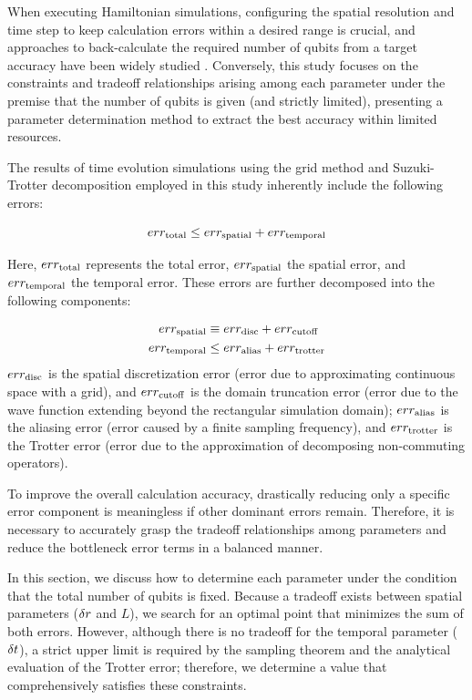 \documentclass[aip-draft.tex]{subfiles}
\begin{document}
When executing Hamiltonian simulations, configuring the spatial resolution and
time step to keep calculation errors within a desired range is crucial, and
approaches to back-calculate the required number of qubits from a target
accuracy have been widely studied \cite{FEIT1982412, Kivlichan_2017,
Chan2023.sciadv.abo7484}. Conversely, this study focuses on the constraints and
tradeoff relationships arising among each parameter under the premise that
the number of qubits is given (and strictly limited), presenting a parameter
determination method to extract the best accuracy within limited resources.

The results of time evolution simulations using the grid method and
Suzuki-Trotter decomposition employed in this study inherently include the
following errors:

\begin{equation}
err_{\mathrm{total}} \leq err_{\mathrm{spatial}} + err_{\mathrm{temporal}}
\label{eq:error-total-decomposition}
\end{equation}

Here, $err_{\mathrm{total}}$ represents the total error, $err_{\mathrm{spatial}}$ the spatial error,
and $err_{\mathrm{temporal}}$ the temporal error. These errors are further decomposed into
the following components:

\begin{align}
    err_{\mathrm{spatial}} &\equiv err_{\mathrm{disc}} + err_{\mathrm{cutoff}} \\
    err_{\mathrm{temporal}} &\leq err_{\mathrm{alias}} + err_{\mathrm{trotter}}
\end{align}
$err_{\mathrm{disc}}$ is the spatial discretization error (error due to approximating
continuous space with a grid), and $err_{\mathrm{cutoff}}$ is the domain truncation error
(error due to the wave function extending beyond the rectangular simulation
domain); $err_{\mathrm{alias}}$ is the aliasing error (error caused by a
finite sampling frequency), and $err_{\mathrm{trotter}}$ is the Trotter error (error due to
the approximation of decomposing non-commuting operators).

To improve the overall calculation accuracy, drastically reducing only a
specific error component is meaningless if other dominant errors remain.
Therefore, it is necessary to accurately grasp the tradeoff relationships among
parameters and reduce the bottleneck error terms in a balanced manner.

In this section, we discuss how to determine each parameter under the condition
that the total number of qubits is fixed. Because a tradeoff exists between
spatial parameters ($\delta r$ and $L$), we search for an optimal point that
minimizes the sum of both errors. However, although there is no tradeoff for the
temporal parameter ($\delta t$), a strict upper limit is required by the sampling
theorem and the analytical evaluation of the Trotter error; therefore, we
determine a value that comprehensively satisfies these constraints.
\end{document}
